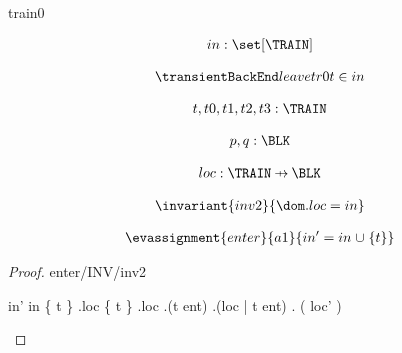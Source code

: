 \documentclass[12pt]{amsart}
\title{}
\author{}
\date{} %
\begin{document}
\maketitle
\tableofcontents


\begin{machine}{train0}


%
	\begin{align*}
\variable{		in : \set[\TRAIN]}
	\end{align*}
%



\begin{align*}
\transient{leave}{0}{tr0}
{	t \in in	}
\end{align*}

\begin{align*}
\dummy{	t,t0,t1,t2,t3 : \TRAIN}
\end{align*}

\begin{align*}
\dummy{	p,q : \BLK}
\end{align*}


\begin{align*}
\variable{	loc : \TRAIN \pfun \BLK}
\end{align*}

\begin{align*}
\invariant{inv2}
{	\dom . loc = in	}
\end{align*}

\begin{align*}
\evassignment{enter}{a1}
{	in' = in \bunion \{ t \}	}
\end{align*}

\begin{proof}{enter/INV/inv2}
	\begin{calculation}
		in'
	\hint{=}{ \ref{a1} }
		in \bunion \{ t \}
	\hint{=}{ \ref{inv2} }
		\dom.loc \bunion \{ t \}
		\dom.loc \bunion \dom.(t \tfun ent)
		\dom.(loc   |   t \tfun ent)
	\hint{=}{ \ref{a2} }
		\dom. ( loc' )
	\end{calculation}
\end{proof}


\end{machine}
\end{document}
